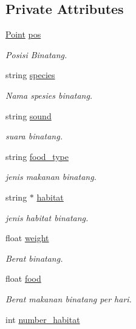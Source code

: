\subsection*{Private Attributes}
\begin{DoxyCompactItemize}
\item 
\hyperlink{classPoint}{Point} \hyperlink{classAnimal_ae4e9a6fe53c7ebfbb00536f0e38de5c8}{pos}
\begin{DoxyCompactList}\small\item\em Posisi Binatang. \end{DoxyCompactList}\item 
string \hyperlink{classAnimal_a70a223fc101b56962088b16a8b18534b}{species}
\begin{DoxyCompactList}\small\item\em Nama spesies binatang. \end{DoxyCompactList}\item 
string \hyperlink{classAnimal_ac800bcdcb21d51f0da161896ef28fd23}{sound}
\begin{DoxyCompactList}\small\item\em suara binatang. \end{DoxyCompactList}\item 
string \hyperlink{classAnimal_a8c5c0ed2cffff3e84f95c15347412737}{food\+\_\+type}
\begin{DoxyCompactList}\small\item\em jenis makanan binatang. \end{DoxyCompactList}\item 
string $\ast$ \hyperlink{classAnimal_ab92cf1826b20ac02c8b342ac9517a9ba}{habitat}
\begin{DoxyCompactList}\small\item\em jenis habitat binatang. \end{DoxyCompactList}\item 
float \hyperlink{classAnimal_a055c4df7dacb89eb4c2ca9bbee11ff24}{weight}
\begin{DoxyCompactList}\small\item\em Berat binatang. \end{DoxyCompactList}\item 
float \hyperlink{classAnimal_adb6cda9dddcd113576b887f01d648711}{food}
\begin{DoxyCompactList}\small\item\em Berat makanan binatang per hari. \end{DoxyCompactList}\item 
int \hyperlink{classAnimal_a4dfc7016e0fc6b658f41edf9b7867e30}{number\+\_\+habitat}

\end{DoxyCompactItemize}
